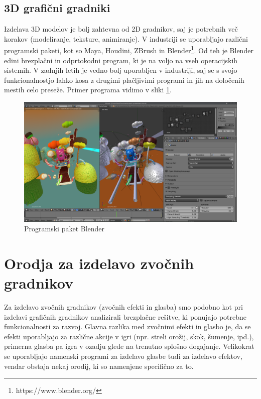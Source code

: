 \documentclass[12pt,a4paper,twoside]{book}
\begin{document}
\subsection{3D grafični gradniki}
Izdelava 3D modelov je bolj zahtevna od 2D gradnikov, saj je potrebnih več korakov (modeliranje, teksture, animiranje). V industriji se uporabljajo različni programski paketi, kot so Maya, Houdini, ZBrush in Blender\footnote{https://www.blender.org/}. Od teh je Blender edini brezplačni in odprtokodni program, ki je na voljo na vseh operacijskih sistemih. V zadnjih letih je vedno bolj uporabljen v industriji, saj se s svojo funkcionalnostjo lahko kosa z drugimi plačljivimi programi in jih na določenih mestih celo preseže. Primer programa vidimo v sliki \ref{slika:blenderDemo}.

\begin{figure}[h]
	\centering
	\includegraphics[width=13cm]{blenderDemo}
	\caption{Programski paket Blender}
	\label{slika:blenderDemo}
\end{figure}

\section{Orodja za izdelavo zvočnih gradnikov}
Za izdelavo zvočnih gradnikov (zvočnih efekti in glasba) smo podobno kot pri izdelavi grafičnih gradnikov analizirali brezplačne rešitve, ki ponujajo potrebne funkcionalnosti za razvoj. Glavna razlika med zvočnimi efekti in glasbo je, da se efekti uporabljajo za različne akcije v igri (npr. streli orožij, skok, šumenje, ipd.), primerna glasba pa igra v ozadju glede na trenutno splošno dogajanje. Velikokrat se uporabljajo namenski programi za izdelavo glasbe tudi za izdelavo efektov, vendar obstaja nekaj orodij, ki so namenjene specifično za to.
\end{document}

